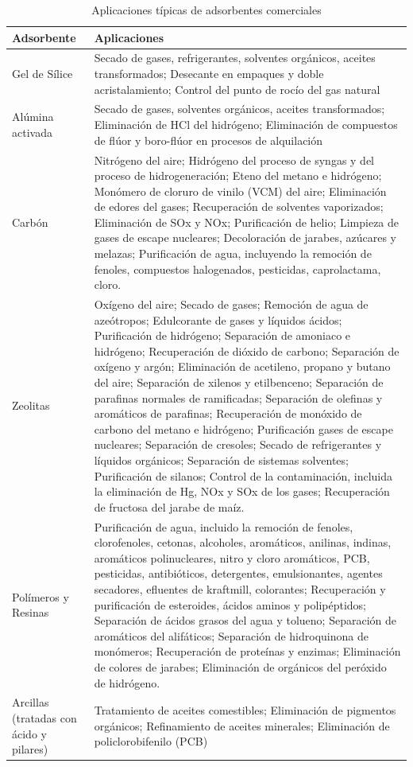 \documentclass[11pt]{book}
\begin{document}
\begin{table}
\caption{\label{Tabla:AplicacionAdsorcion}Aplicaciones típicas de adsorbentes comerciales}

\begin{tabular}{|p{4.5cm}|p{12cm}|}
\hline
Adsorbente  & Aplicaciones  \\
\hline
Gel de Sílice   & Secado de gases, refrigerantes, solventes orgánicos, aceites transformados; Desecante en empaques y doble acristalamiento; Control del punto de rocío del gas natural \\ 
\hline
Alúmina activada & Secado de gases, solventes orgánicos, aceites transformados; Eliminación de HCl del hidrógeno; Eliminación de compuestos de flúor y boro-flúor en procesos de alquilación \\ 
\hline
Carbón  & Nitrógeno del aire; Hidrógeno del proceso de syngas y del proceso de hidrogeneración; Eteno del metano e hidrógeno; Monómero de cloruro de vinilo (VCM) del aire; Eliminación de edores del gases; Recuperación de solventes vaporizados; Eliminación de SOx y NOx; Purificación de helio; Limpieza de gases de escape nucleares; Decoloración de jarabes, azúcares y melazas; Purificación de agua, incluyendo la remoción de fenoles, compuestos halogenados, pesticidas, caprolactama, cloro. \\ 
\hline
Zeolitas   & Oxígeno del aire; Secado de gases; Remoción de agua de azeótropos; Edulcorante de gases y líquidos ácidos; Purificación de hidrógeno; Separación de amoniaco e hidrógeno; Recuperación de dióxido de carbono; Separación de oxígeno y argón; Eliminación de acetileno, propano y butano del aire; Separación de xilenos y etilbenceno; Separación de parafinas normales de ramificadas; Separación de olefinas y aromáticos de parafinas; Recuperación de monóxido de carbono del metano e hidrógeno; Purificación gases de escape nucleares; Separación de cresoles; Secado de refrigerantes y líquidos orgánicos; Separación de sistemas solventes; Purificación de silanos; Control de la contaminación, incluida la eliminación de Hg, NOx y SOx de los gases; Recuperación de fructosa del jarabe de maíz. \\ 
\hline
Polímeros y Resinas  & Purificación de agua, incluido la remoción de fenoles, clorofenoles, cetonas, alcoholes, aromáticos, anilinas, indinas, aromáticos polinucleares, nitro y cloro aromáticos, PCB, pesticidas, antibióticos, detergentes, emulsionantes, agentes secadores, efluentes de kraftmill, colorantes; Recuperación y purificación de esteroides, ácidos aminos y polipéptidos; Separación de ácidos grasos del agua y tolueno; Separación de aromáticos del alifáticos; Separación de hidroquinona de monómeros; Recuperación de proteínas y enzimas; Eliminación de colores de jarabes; Eliminación de orgánicos del peróxido de hidrógeno.  \\
\hline
Arcillas (tratadas con ácido y pilares) & Tratamiento de aceites comestibles; Eliminación de pigmentos orgánicos; Refinamiento de aceites minerales; Eliminación de policlorobifenilo (PCB)  \\ 
\hline
\end{tabular}
\end{table}
\end{document}
